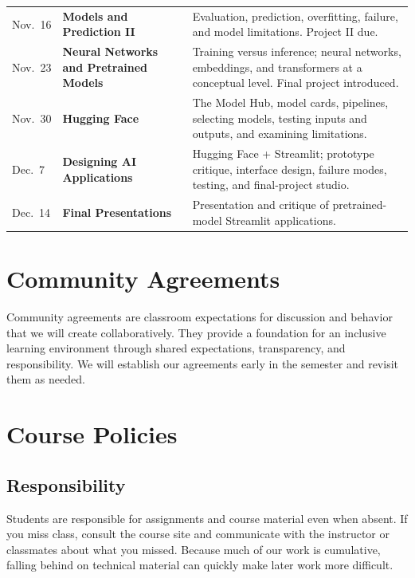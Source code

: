 \documentclass[11pt]{article}
\begin{document}
\begin{tabularx}{\textwidth}{@{}p{}p{}X@{}}
Nov.\ 16 &
\textbf{Models and Prediction II} &
Evaluation, prediction, overfitting, failure, and model limitations.
Project II due. \\

Nov.\ 23 &
\textbf{Neural Networks and Pretrained Models} &
Training versus inference; neural networks, embeddings, and transformers at a
conceptual level. Final project introduced. \\

Nov.\ 30 &
\textbf{Hugging Face} &
The Model Hub, model cards, pipelines, selecting models, testing inputs and
outputs, and examining limitations. \\

Dec.\ 7 &
\textbf{Designing AI Applications} &
Hugging Face + Streamlit; prototype critique, interface design, failure
modes, testing, and final-project studio. \\

Dec.\ 14 &
\textbf{Final Presentations} &
Presentation and critique of pretrained-model Streamlit applications. \\

\bottomrule
\end{tabularx}

\section{Community Agreements}

Community agreements are classroom expectations for discussion and behavior
that we will create collaboratively. They provide a foundation for an
inclusive learning environment through shared expectations, transparency,
and responsibility. We will establish our agreements early in the semester
and revisit them as needed.

\section{Course Policies}

\subsection{Responsibility}

Students are responsible for assignments and course material even when
absent. If you miss class, consult the course site and communicate with the
instructor or classmates about what you missed. Because much of our work is
cumulative, falling behind on technical material can quickly make later work
more difficult.
\end{document}
